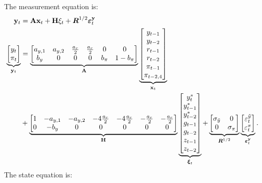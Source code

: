 \documentclass[a4paper,12pt]{article}
\newcommand{\bsq}{\begin{subequations}}\newcommand{\esq}{\end{subequations}}
\begin{document}
The measurement equation is:\bsq\label{obs0}
\begin{align}
\mathbf{y}_{t}& =\mathbf{Ax}_{t}+\mathbf{H}\xi _{t}+\boldsymbol{R}^{1/2}%
\boldsymbol{\varepsilon }_{t}^{\mathbf{y}}  \notag \\
\underbrace{%
\begin{bmatrix}
y_{t} \\
\pi _{t}%
\end{bmatrix}%
}_{\mathbf{y}_{t}}& =\underbrace{%
\begin{bmatrix}
a_{y,1} & a_{y,2} & \frac{a_{r}}{2} & \frac{a_{r}}{2} & 0 & 0 \\
b_{y} & 0 & 0 & 0 & b_{\pi } & 1-b_{\pi }%
\end{bmatrix}%
}_{\mathbf{A}}\underbrace{%
\begin{bmatrix}
y_{t-1} \\
y_{t-2} \\
r_{t-1} \\
r_{t-2} \\
\pi _{t-1} \\
\pi _{t-2,4}%
\end{bmatrix}%
}_{\mathbf{x}_{t}} \\
& +\underbrace{%
\begin{bmatrix}
1 & -a_{y,1} & -a_{y,2} & -4\frac{a_{r}}{2} & -4\frac{a_{r}}{2} & -\frac{%
a_{r}}{2} & -\frac{a_{r}}{2} \\
0 & -b_{y} & 0 & 0 & 0 & 0 & 0%
\end{bmatrix}%
}_{\mathbf{H}}\underbrace{%
\begin{bmatrix}
y_{t}^{\ast } \\
y_{t-1}^{\ast } \\
y_{t-2}^{\ast } \\
g_{t-1} \\
g_{t-2} \\
z_{t-1} \\
z_{t-2}%
\end{bmatrix}%
}_{\boldsymbol{\xi }_{t}}+\underbrace{%
\begin{bmatrix}
\sigma _{\tilde{y}} & 0 \\
0 & \sigma _{\pi }%
\end{bmatrix}%
}_{\boldsymbol{R}^{1/2}}\underbrace{%
\begin{bmatrix}
\varepsilon _{t}^{\tilde{y}} \\
\varepsilon _{t}^{\pi }%
\end{bmatrix}%
}_{\boldsymbol{\varepsilon }_{t}^{\mathbf{y}}}.
\end{align}%
\esq The state equation is:%
\end{document}
